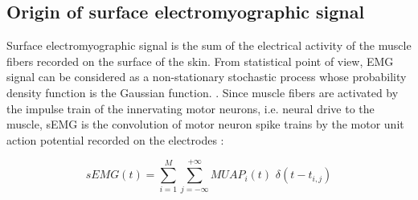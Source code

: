 \subsection{Origin of surface electromyographic signal}
Surface electromyographic signal is the sum of the electrical activity of the muscle fibers recorded on the surface of the skin. From statistical point of view, EMG signal can be considered as a non-stationary stochastic process whose probability density function is the Gaussian function. \citep{DeLuca1984, DeLuca1979}. Since muscle fibers are activated by the impulse train of the innervating motor neurons, i.e. neural drive to the muscle, sEMG is the convolution of motor neuron spike trains by the motor unit action potential recorded on the electrodes \citep{Farina2010, Farina2014}:

\begin{equation}
sEMG(t) = \sum_{i=1}^{M} \sum_{j=-\infty}^{+\infty} MUAP_i(t)\,\, \delta(t-t_{i,j})
\end{equation}

